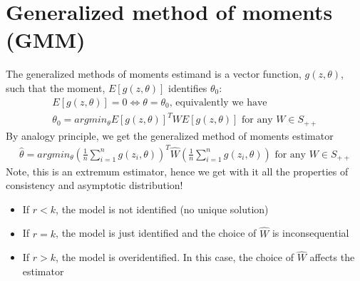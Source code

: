\documentclass{article}
\begin{document}
\section{Generalized method of moments (GMM)}
The generalized methods of moments estimand is a vector function, $g(z, \theta)$, such that the moment, $E[g(z, \theta)]$ identifies $\theta_0$:
\begin{align*}
  E[g(z, \theta)] = 0 \iff \theta = \theta_0 \textrm{, equivalently we have }\\
  \theta_0 = argmin_\theta E[g(z, \theta)]^T WE[g(z, \theta)] \textrm{ for any } W \in S_{++}
\end{align*}
By analogy principle, we get the generalized method of moments estimator
\begin{align*}
  \hat{\theta} = argmin_\theta \left(\frac{1}{n}\sum_{i=1}^n g(z_i, \theta)\right)^T \hat{W} \left(\frac{1}{n}\sum_{i=1}^n g(z_i, \theta)\right) \textrm{ for any } W \in S_{++}
\end{align*}
Note, this is an extremum estimator, hence we get with it all the properties of consistency and asymptotic distribution!

\begin{itemize}
  \item If $r < k$, the model is not identified (no unique solution)
  \item If $r = k$, the model is just identified and the choice of $\hat{W}$ is inconsequential
  \item If $r > k$, the model is overidentified. In this case, the choice of $\hat{W}$ affects the estimator
\end{itemize}
\end{document}
